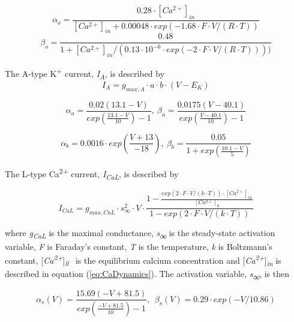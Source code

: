 \documentclass[12pt]{article}
\begin{document}
\begin{equation}
\alpha_{o} = \frac{0.28 \cdot[Ca^{2+}]_{in}}{[Ca^{2+}]_{in} + 0.00048	\cdot exp(-1.68 \cdot F \cdot V / (R \cdot T)) }
\end{equation}
\begin{equation}
\beta_{o} = \frac{0.48}{1 + [Ca^{2+}]_{in} / (0.13 \cdot 10^{-6} \cdot exp(-2 \cdot F \cdot V/ (R \cdot T))) )}
\end{equation}

The A-type K\textsuperscript{+} current,
\textit{I}\textit{\textsubscript{A}}, is described by\ \ 
\begin{equation}
I_A=g_{max, A} \cdot a \cdot b  \cdot (V-E_K)
\end{equation}

\begin{equation}
\alpha_a=\frac{0.02(13.1-V)}{exp(\frac{13.1-V}{10})-1}, \ 
\beta_a=\frac{0.0175(V-40.1)}{exp(\frac{V-40.1}{10})-1}
\end{equation}

\begin{equation}
\alpha_b = 0.0016 \cdot exp(\frac{V + 13}{-18}), \  \beta_b=\frac{0.05}{1+exp(\frac{10.1-V}{5})}
\end{equation}

The L-type Ca\textsuperscript{2+} current, \textit{I\textsubscript{CaL}}, is described by


\begin{equation}
I_{CaL}=g_{max, CaL}\cdot s_{\infty }^2\cdot V \cdot
\frac{1-\frac{exp(2 \cdot F \cdot V/ (k \cdot T)) \cdot [Ca^{2+}]_{in}}{[Ca^{2+}]_{0}}} {1-exp(2 \cdot F \cdot V/(k \cdot T))} 
\end{equation}


where \textit{g}\textit{\textsubscript{CaL}} is the maximal conductance, \textit{s}\textsf{\textit{\textsubscript{∞}}}
is the steady-state activation variable, \textit{F} is Faraday’s constant, \textit{T} is the temperature, \textit{k} is
Boltzmann’s constant, [\textit{Ca\textsuperscript{2+}}]\textit{\textsubscript{0}} \ is the equilibrium calcium concentration and [\textit{Ca\textsuperscript{2+}}]\textit{\textsubscript{in}} is
described in equation (\ref{eq:CaDynamics}). The activation variable, \textit{s\textsubscript{∞}}, is then


\begin{equation}
\alpha_s(V) = \frac{15.69(-V+81.5)}{exp(\frac{-V+81.5}{10})-1} , \ \  
\beta_s(V )= 0.29\cdot exp(-V/10.86)
\end{equation}
\end{document}

